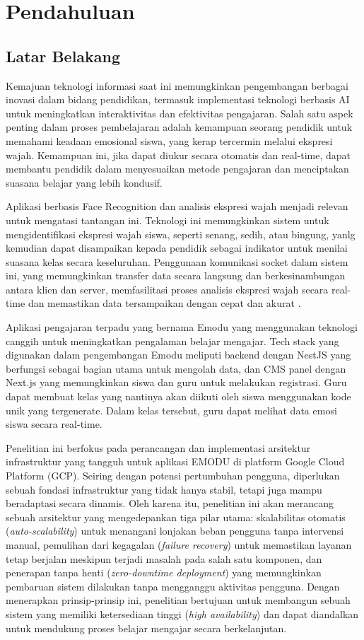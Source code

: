 \chapter{Pendahuluan}
\section{Latar Belakang}
\qquad Kemajuan teknologi informasi saat ini memungkinkan pengembangan berbagai inovasi dalam bidang pendidikan, termasuk implementasi teknologi berbasis AI untuk meningkatkan interaktivitas dan efektivitas pengajaran.
Salah satu aspek penting dalam proses pembelajaran adalah kemampuan seorang pendidik untuk memahami keadaan emosional siswa, yang kerap tercermin melalui ekspresi wajah.
Kemampuan ini, jika dapat diukur secara otomatis dan real-time, dapat membantu pendidik dalam menyesuaikan metode pengajaran dan menciptakan suasana belajar yang lebih kondusif.

Aplikasi berbasis Face Recognition dan analisis ekspresi wajah menjadi relevan untuk mengatasi tantangan ini.
Teknologi ini memungkinkan sistem untuk mengidentifikasi ekspresi wajah siswa, seperti senang, sedih, atau bingung, yanlg kemudian dapat disampaikan kepada pendidik sebagai indikator untuk menilai suasana kelas secara keseluruhan.
Penggunaan komunikasi socket dalam sistem ini, yang memungkinkan transfer data secara langsung dan berkesinambungan antara klien dan server, memfasilitasi proses analisis ekspresi wajah secara real-time dan memastikan data tersampaikan dengan cepat dan akurat \parencite{ogundeyiWebSocketRealTime2019}.

Aplikasi pengajaran terpadu yang bernama Emodu yang menggunakan teknologi canggih untuk meningkatkan pengalaman belajar mengajar.
Tech stack yang digunakan dalam pengembangan Emodu meliputi backend dengan NestJS yang berfungsi sebagai bagian utama untuk mengolah data, dan CMS panel dengan Next.js yang memungkinkan siswa dan guru untuk melakukan registrasi.
Guru dapat membuat kelas yang nantinya akan diikuti oleh siswa menggunakan kode unik yang tergenerate.
Dalam kelas tersebut, guru dapat melihat data emosi siswa secara real-time.

Penelitian ini berfokus pada perancangan dan implementasi arsitektur infrastruktur yang tangguh untuk aplikasi EMODU di platform Google Cloud Platform (GCP).
Seiring dengan potensi pertumbuhan pengguna, diperlukan sebuah fondasi infrastruktur yang tidak hanya stabil, tetapi juga mampu beradaptasi secara dinamis.
Oleh karena itu, penelitian ini akan merancang sebuah arsitektur yang mengedepankan tiga pilar utama: skalabilitas otomatis (\textit{auto-scalability}) untuk menangani lonjakan beban pengguna tanpa intervensi manual, pemulihan dari kegagalan (\textit{failure recovery}) untuk memastikan layanan tetap berjalan meskipun terjadi masalah pada salah satu komponen, dan penerapan tanpa henti (\textit{zero-downtime deployment}) yang memungkinkan pembaruan sistem dilakukan tanpa mengganggu aktivitas pengguna.
Dengan menerapkan prinsip-prinsip ini, penelitian bertujuan untuk membangun sebuah sistem yang memiliki ketersediaan tinggi (\textit{high availability}) dan dapat diandalkan untuk mendukung proses belajar mengajar secara berkelanjutan.

